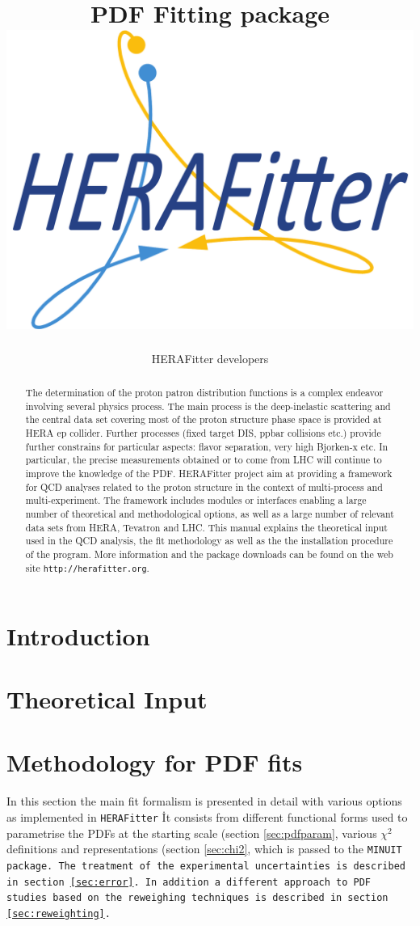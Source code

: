 \documentclass[11pt,twoside,a4paper]{article}
\title{ \vspace{1cm} {\Huge \fitter\ } \\
              PDF Fitting package  \\ 
              \vspace{0.5cm}
\includegraphics[width=0.25\linewidth]{figures/logo.pdf}}
\author{HERAFitter developers}
\newcommand\fitter{ \mbox{\tt HERAFitter} }
\begin{document}
\maketitle
\vspace{4cm}
\begin{abstract}
\vspace{0.5cm}
The determination of the  proton patron distribution functions is a complex endeavor involving several physics process. The main process is the deep-inelastic scattering and the central  data set covering most of the proton structure phase space is provided at HERA ep collider. Further processes (fixed target DIS, ppbar collisions etc.) provide further constrains for particular aspects: flavor separation, very high Bjorken-x etc. In particular, the precise measurements obtained or to come from LHC will continue to improve the knowledge of the PDF. HERAFitter project aim at providing a framework for QCD analyses related to the proton structure in the context of multi-process and multi-experiment. The framework includes modules or interfaces enabling a large number of theoretical and methodological options, as well as a large number of relevant data sets from HERA, Tevatron and LHC. This manual explains the theoretical input used in the QCD analysis, the fit  methodology as well as the  the installation procedure of the program. More information and the package downloads can be found on the web site {\tt http://herafitter.org}.
\end{abstract}
\thispagestyle{empty}
\newpage
\tableofcontents
\newpage
\section{Introduction}
  
\section{Theoretical Input}


\section{Methodology for PDF fits}
In this section the main fit formalism is presented in detail with various options 
as implemented in \fitter\. It consists from different functional forms used to 
parametrise the PDFs at the starting scale (section \ref{sec:pdfparam}, 
various $\chi^2$ definitions and representations (section \ref{sec:chi2}, 
which is passed to the \tt MINUIT \rm package. The treatment of the experimental 
uncertainties is described in section \ref{sec:error}. In addition a different approach 
to PDF studies based on the reweighing techniques is described in section \ref{sec:reweighting}.
\end{document}

